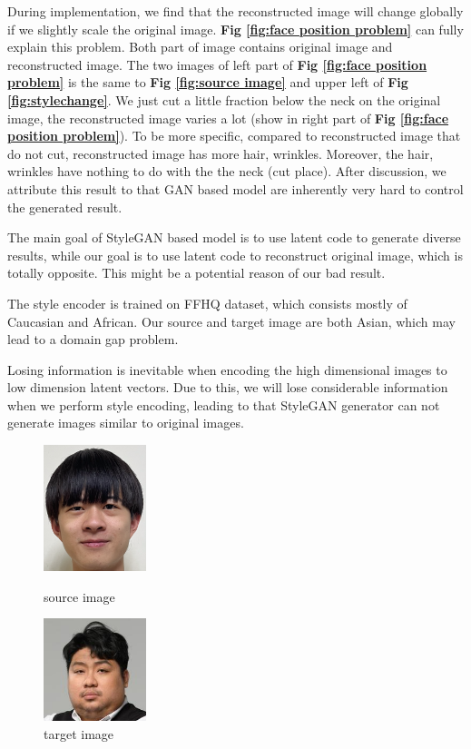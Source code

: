 During implementation, we find that the reconstructed image will change globally if we slightly scale the original image. \textbf{Fig \ref{fig:face position problem}} can fully explain this problem. Both part of image contains original image and reconstructed image. The two images of left part of \textbf{Fig \ref{fig:face position problem}} is the same to \textbf{Fig \ref{fig:source image}} and upper left of \textbf{Fig \ref{fig:stylechange}}. We just cut a little fraction below the neck on the original image, the reconstructed image varies a lot (show in right part of \textbf{Fig \ref{fig:face position problem}}). To be more specific, compared to reconstructed image that do not cut, reconstructed image has more hair, wrinkles. Moreover, the hair, wrinkles have nothing to do with the the neck (cut place). After discussion, we attribute this result to that GAN based model are inherently very hard to control the generated result.

The main goal of StyleGAN based model is to use latent code to generate diverse results, while our goal is to use latent code to reconstruct original image, which is totally opposite. This might be a potential reason of our bad result.

The style encoder is trained on FFHQ dataset, which consists mostly of Caucasian and African. Our source and target image are both Asian, which may lead to a domain gap problem.

Losing information is inevitable when encoding the high dimensional images to low dimension latent vectors. Due to this, we will lose considerable information when we perform style encoding, leading to that StyleGAN generator can not generate images similar to original images.


\begin{figure}
\centering
    \begin{minipage}[t]{0.48\textwidth}
    \centering
    \includegraphics[width=3cm]{fig/source_image.png}
    \caption{source image}
    \label{fig:source image}
    \end{minipage}
    \begin{minipage}[t]{0.48\textwidth}
    \centering
    \includegraphics[width=3cm]{fig/target_image.png}
    \caption{target image}
    \label{fig:target image}
    \end{minipage}
\end{figure}

